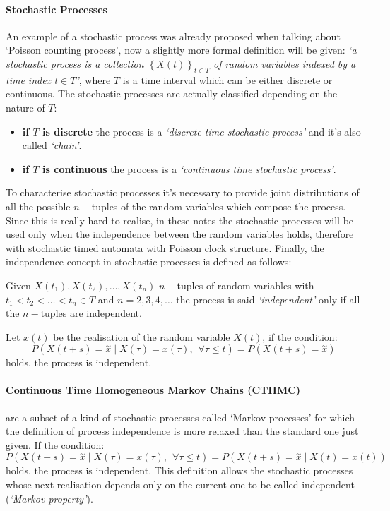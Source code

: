 \documentclass[12pt,a4paper]{article}
\begin{document}
\paragraph{Stochastic Processes}
An example of a stochastic process was already proposed when talking about `Poisson counting process', now a slightly more formal definition will be given: \emph{`a stochastic process is a collection $\left\lbrace X\left(t\right) \right\rbrace_{t\in T} $
of random variables indexed by a time index $t\in T$'}, where $T$ is a time interval which can be either discrete or continuous.
The stochastic processes are actually classified depending on the nature of $T$:
\begin{itemize}
\item \textbf{if $T$ is discrete} the process is a \emph{`discrete time stochastic process'} 
and it's also called \emph{`chain'}.
\item \textbf{if $T$ is continuous} the process is a \emph{`continuous time stochastic process'}.
\end{itemize}
To characterise stochastic processes it's necessary to provide joint distributions of all the possible $n-$tuples of the random variables which compose the process. Since this is really hard to realise, in these notes the stochastic processes will be used
only when the independence between the random variables holds, therefore with stochastic timed automata with Poisson clock structure. Finally, the independence concept in stochastic processes is defined as follows:

\bigskip
\noindent 
Given $X(t_1), X(t_2),\dots, X(t_n)$ $n-$tuples of random variables with $t_1<t_2<\dots<t_n \in T$ and $n=2,3,4,\dots$ the process is said \emph{`independent'} only if all the $n-$tuples are independent. 

\bigskip
\noindent 
Let $x(t)$ be the realisation of the random variable $X(t)$, if the condition:
$$
P\left(X\left(t+s\right)=\overset{\sim}{x} \mid X\left(\tau\right)=
x\left(\tau\right),\hspace{5pt}\forall\tau\leq t\right)=
P\left(X\left(t+s\right)=\overset{\sim}{x} \right)
$$
holds, the process is independent.
\paragraph{Continuous Time Homogeneous Markov Chains (CTHMC)} are a subset of a kind of stochastic processes called `Markov processes' for which the definition of process independence is more relaxed than the standard one just given. If the condition:
$$
P\left(X\left(t+s\right)=\overset{\sim}{x} \mid X\left(\tau\right)=
x\left(\tau\right),\hspace{5pt}\forall\tau\leq t\right)=
P\left(X\left(t+s\right)=\overset{\sim}{x}  \mid  X\left(t\right)=x\left(t\right)\right)
$$
holds, the process is independent. This definition allows the stochastic processes whose next realisation depends only on the current one to be called independent (\emph{`Markov property'}).
\end{document}
